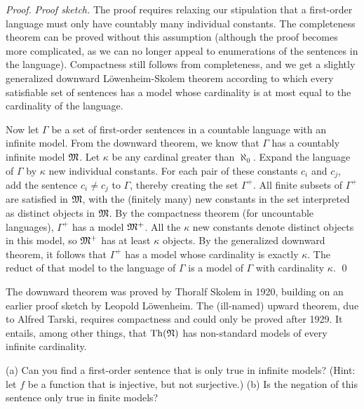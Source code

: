 \begin{proof}
  \emph{Proof sketch.}
  The proof requires relaxing our stipulation that
  a first-order language must only have countably many individual constants.
  The completeness theorem can be proved without this assumption
  (although the proof becomes more complicated,
  as we can no longer appeal to enumerations of the sentences in the language).
  Compactness still follows from completeness,
  and we get a slightly generalized downward Löwenheim-Skolem theorem
  according to which every satisfiable set of sentences has a model
  whose cardinality is at most equal to the cardinality of the language.

  Now let $\Gamma$ be a set of first-order sentences in a countable language
  with an infinite model.
  From the downward theorem,
  we know that $\Gamma$ has a countably infinite model $\mathfrak{M}$.
  Let $\kappa$ be any cardinal greater than $\aleph_0$.
  Expand the language of $\Gamma$ by $\kappa$ new individual constants.
  For each pair of these constants $c_{i}$ and $c_{j}$,
  add the sentence $c_{i} \neq c_{j}$ to $\Gamma$,
  thereby creating the set $\Gamma^{+}$.
  All finite subsets of $\Gamma^{+}$ are satisfied in $\mathfrak{M}$,
  with the (finitely many) new constants in the set interpreted as distinct objects in $\mathfrak{M}$.
  By the compactness theorem (for uncountable languages),
  $\Gamma^{+}$ has a model $\mathfrak{M}^{+}$.
  All the $\kappa$ new constants denote distinct objects in this model,
  so $\mathfrak{M}^+$ has at least $\kappa$ objects.
  By the generalized downward theorem,
  it follows that $\Gamma^{+}$ has a model whose cardinality is exactly $\kappa$.
  The reduct of that model to the language of $\Gamma$ is a model of $\Gamma$ with cardinality $\kappa$.
  \qed
\end{proof}

The downward theorem was proved by Thoralf Skolem in 1920,
building on an earlier proof sketch by Leopold Löwenheim.
The (ill-named) upward theorem,
due to Alfred Tarski,
requires compactness and could only be proved after 1929.
It entails,
among other things,
that $\mathrm{Th}(\mathfrak{N})$ has non-standard models of every infinite cardinality.

\begin{exercise}
  (a) Can you find a first-order sentence that is only true in infinite models?
  (Hint: let $f$ be a function that is injective, but not surjective.)
  (b) Is the negation of this sentence only true in finite models?
\end{exercise}

